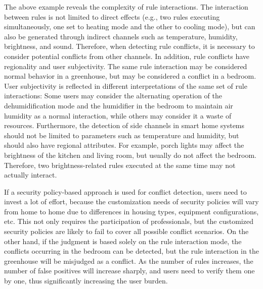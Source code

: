 The above example reveals the complexity of rule interactions. The interaction between rules is not limited to direct effects (e.g., two rules executing simultaneously, one set to heating mode and the other to cooling mode), but can also be generated through indirect channels such as temperature, humidity, brightness, and sound. Therefore, when detecting rule conflicts, it is necessary to consider potential conflicts from other channels. In addition, rule conflicts have regionality and user subjectivity. The same rule interaction may be considered normal behavior in a greenhouse, but may be considered a conflict in a bedroom. User subjectivity is reflected in different interpretations of the same set of rule interactions: Some users may consider the alternating operation of the dehumidification mode and the humidifier in the bedroom to maintain air humidity as a normal interaction, while others may consider it a waste of resources. Furthermore, the detection of side channels in smart home systems should not be limited to parameters such as temperature and humidity, but should also have regional attributes. For example, porch lights may affect the brightness of the kitchen and living room, but usually do not affect the bedroom. Therefore, two brightness-related rules executed at the same time may not actually interact.

If a security policy-based approach is used for conflict detection, users need to invest a lot of effort, because the customization needs of security policies will vary from home to home due to differences in housing types, equipment configurations, etc. This not only requires the participation of professionals, but the customized security policies are likely to fail to cover all possible conflict scenarios. On the other hand, if the judgment is based solely on the rule interaction mode, the conflicts occurring in the bedroom can be detected, but the rule interaction in the greenhouse will be misjudged as a conflict. As the number of rules increases, the number of false positives will increase sharply, and users need to verify them one by one, thus significantly increasing the user burden.

